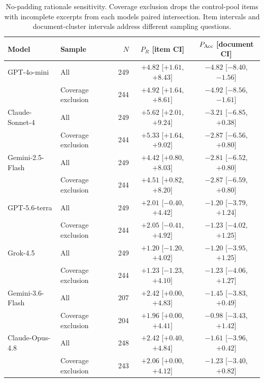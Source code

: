 \begin{table}[t]
\caption{No-padding rationale sensitivity. Coverage exclusion drops the control-pool items with incomplete excerpts from each model\textquotesingle s paired intersection. Item intervals and document-cluster intervals address different sampling questions.}
\label{tab:clean_sensitivity}
\centering\small
\setlength{\tabcolsep}{3.5pt}
\begin{tabular}{llrcc}
\toprule
Model & Sample & $N$ & $P_R$ [item CI] & $P_{\rm Acc}$ [document CI] \\
\midrule
GPT-4o-mini & All & 249 & $+4.82$ [$+1.61$, $+8.43$] & $-4.82$ [$-8.40$, $-1.56$] \\
 & Coverage exclusion & 244 & $+4.92$ [$+1.64$, $+8.61$] & $-4.92$ [$-8.56$, $-1.61$] \\
Claude-Sonnet-4 & All & 249 & $+5.62$ [$+2.01$, $+9.24$] & $-3.21$ [$-6.85$, $+0.38$] \\
 & Coverage exclusion & 244 & $+5.33$ [$+1.64$, $+9.02$] & $-2.87$ [$-6.56$, $+0.80$] \\
Gemini-2.5-Flash & All & 249 & $+4.42$ [$+0.80$, $+8.03$] & $-2.81$ [$-6.52$, $+0.80$] \\
 & Coverage exclusion & 244 & $+4.51$ [$+0.82$, $+8.20$] & $-2.87$ [$-6.59$, $+0.80$] \\
GPT-5.6-terra & All & 249 & $+2.01$ [$-0.40$, $+4.42$] & $-1.20$ [$-3.79$, $+1.24$] \\
 & Coverage exclusion & 244 & $+2.05$ [$-0.41$, $+4.92$] & $-1.23$ [$-4.02$, $+1.25$] \\
Grok-4.5 & All & 249 & $+1.20$ [$-1.20$, $+4.02$] & $-1.20$ [$-3.95$, $+1.25$] \\
 & Coverage exclusion & 244 & $+1.23$ [$-1.23$, $+4.10$] & $-1.23$ [$-4.06$, $+1.27$] \\
Gemini-3.6-Flash & All & 207 & $+2.42$ [$+0.00$, $+4.83$] & $-1.45$ [$-3.83$, $+0.49$] \\
 & Coverage exclusion & 204 & $+1.96$ [$+0.00$, $+4.41$] & $-0.98$ [$-3.43$, $+1.42$] \\
Claude-Opus-4.8 & All & 248 & $+2.42$ [$+0.40$, $+4.84$] & $-1.61$ [$-3.96$, $+0.42$] \\
 & Coverage exclusion & 243 & $+2.06$ [$+0.00$, $+4.12$] & $-1.23$ [$-3.40$, $+0.82$] \\
\bottomrule
\end{tabular}
\end{table}

